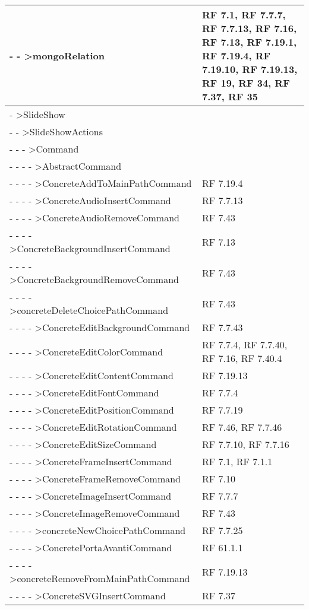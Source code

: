 {\begin{longtable} [c]{| p{8cm} | p{5cm} |}
 \hline 
- - >mongoRelation & RF 7.1, RF 7.7.7, RF 7.7.13, RF 7.16, RF 7.13, RF 7.19.1, RF 7.19.4, RF 7.19.10, RF 7.19.13, RF 19, RF 34, RF 7.37, RF 35\\ 
 \hline 
- >SlideShow & \\ 
 \hline 
- - >SlideShowActions & \\ 
 \hline 
- - - >Command & \\ 
 \hline 
- - - - >AbstractCommand & \\ 
 \hline 
- - - - >ConcreteAddToMainPathCommand & RF 7.19.4\\ 
 \hline 
- - - - >ConcreteAudioInsertCommand & RF 7.7.13\\ 
 \hline 
- - - - >ConcreteAudioRemoveCommand & RF 7.43\\ 
 \hline 
- - - - >ConcreteBackgroundInsertCommand & RF 7.13\\ 
 \hline 
- - - - >ConcreteBackgroundRemoveCommand & RF 7.43\\ 
 \hline 
- - - - >concreteDeleteChoicePathCommand & RF 7.43\\ 
 \hline 
- - - - >ConcreteEditBackgroundCommand & RF 7.7.43\\ 
 \hline 
- - - - >ConcreteEditColorCommand & RF 7.7.4, RF 7.7.40, RF 7.16, RF 7.40.4\\ 
 \hline 
- - - - >ConcreteEditContentCommand & RF 7.19.13\\ 
 \hline 
- - - - >ConcreteEditFontCommand & RF 7.7.4\\ 
 \hline 
- - - - >ConcreteEditPositionCommand & RF 7.7.19\\ 
 \hline 
- - - - >ConcreteEditRotationCommand & RF 7.46, RF 7.7.46\\ 
 \hline 
- - - - >ConcreteEditSizeCommand & RF 7.7.10, RF 7.7.16\\ 
 \hline 
- - - - >ConcreteFrameInsertCommand & RF 7.1, RF 7.1.1\\ 
 \hline 
- - - - >ConcreteFrameRemoveCommand & RF 7.10\\ 
 \hline 
- - - - >ConcreteImageInsertCommand & RF 7.7.7\\ 
 \hline 
- - - - >ConcreteImageRemoveCommand & RF 7.43\\ 
 \hline 
- - - - >concreteNewChoicePathCommand & RF 7.7.25\\ 
 \hline 
- - - - >ConcretePortaAvantiCommand & RF 61.1.1\\ 
 \hline 
- - - - >concreteRemoveFromMainPathCommand & RF 7.19.13\\ 
 \hline 
- - - - >ConcreteSVGInsertCommand & RF 7.37\\ 

\end{longtable}}
